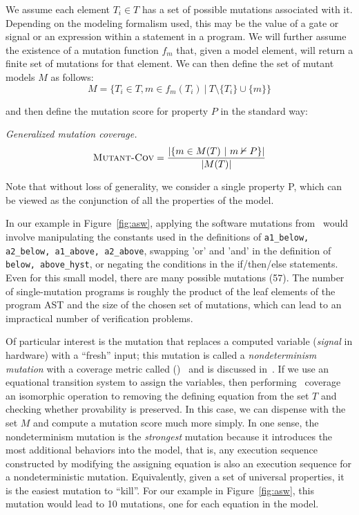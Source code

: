 We assume each element $T_i \in T$ has a set of possible mutations associated with it.  Depending on the modeling formalism used, this may be the value of a gate or signal or an expression within a statement in a program.  We will further assume the existence of a mutation function $f_{m}$ that, given a model element, will return a finite set of mutations for that element.  We can then define the set of mutant models $M$ as follows:
\[
    M = \{ T_i \in T, m \in f_{m}(T_i)\ |\ T \setminus \{T_i\} \cup \{m\} \}
\]

\noindent and then define the mutation score for property $P$ in the standard way:

\begin{definition} {\emph{Generalized mutation coverage.} } \\
\[
   \text{\sc Mutant-Cov} = \frac{ | \{m \in M(T)~|~ m \nvdash P\} |}{|M(T)|}
\]
\end{definition}
Note that without loss of generality, we consider a single property P, which can be viewed as the conjunction of all the properties of the model.

In our example in Figure~\ref{fig:asw}, applying the software mutations from~\cite{Andrews06:mutation} would involve manipulating the constants used in the definitions of \texttt{a1\_below, a2\_below, a1\_above, a2\_above}, swapping 'or' and 'and' in the definition of \texttt{below, above\_hyst}, or negating the conditions in the if/then/else statements.  Even for this small model, there are many possible mutations (57).  The number of single-mutation programs is roughly the product of the leaf elements of the program AST and the size of the chosen set of mutations, which can lead to an impractical number of verification problems.

Of particular interest is the mutation that replaces a computed variable ({\em signal} in hardware) with a ``fresh'' input; this mutation is called a {\em nondeterminism mutation} with a coverage metric called (\nondetcov)~\cite{chockler2010coverage} and is discussed in~\cite{Kupferman:2006:SCF,kupferman_theory_2008,chockler2010coverage}.  If we use an equational transition system to assign the variables, then performing \nondetcov\ coverage an isomorphic operation to removing the defining equation from the set $T$ and checking whether provability is preserved.  In this case, we can dispense with the set $M$ and compute a mutation score much more simply. In one sense, the nondeterminism mutation is the {\em strongest} mutation because it introduces the most additional behaviors into the model, that is, any execution sequence constructed by modifying the assigning equation is also an execution sequence for a nondeterministic mutation.  Equivalently, given a set of universal properties, it is the easiest mutation to ``kill''.  For our example in Figure~\ref{fig:asw}, this mutation would lead to 10 mutations, one for each equation in the model.

